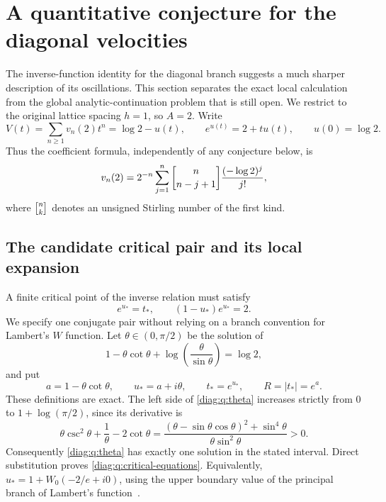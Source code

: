 \section{A quantitative conjecture for the diagonal velocities}
\label{diag:q:sec}

The inverse-function identity for the diagonal branch suggests a much
sharper description of its oscillations.  This section separates the exact
local calculation from the global analytic-continuation problem that is
still open.  We restrict to the original lattice spacing $h=1$, so $A=2$.
Write
\begin{equation}\label{diag:q:inverse}
 V(t)=\sum_{n\geq1}v_n(2)t^n=\log2-u(t),\qquad
 e^{u(t)}=2+tu(t),\qquad u(0)=\log2.
\end{equation}
Thus the coefficient formula, independently of any conjecture below, is
\begin{equation}\label{diag:q:exact-coefficients}
 v_n(2)=2^{-n}\sum_{j=1}^{n}
    \stirling{n}{n-j+1}\frac{(-\log2)^j}{j!},
\end{equation}
where $\stirling{n}{k}$ denotes an unsigned Stirling number of the first kind.

\subsection{The candidate critical pair and its local expansion}
\label{diag:q:critical-subsection}

A finite critical point of the inverse relation must satisfy
\begin{equation}\label{diag:q:critical-equations}
 e^{u_*}=t_*,\qquad (1-u_*)e^{u_*}=2.
\end{equation}
We specify one conjugate pair without relying on a branch convention for
Lambert's $W$ function.  Let $\theta\in(0,\pi/2)$ be the solution of
\begin{equation}\label{diag:q:theta}
 1-\theta\cot\theta+
       \log\!\left(\frac{\theta}{\sin\theta}\right)=\log2,
\end{equation}
and put
\begin{equation}\label{diag:q:parameters}
 a=1-\theta\cot\theta,\qquad u_*=a+i\theta,\qquad
 t_*=e^{u_*},\qquad R=|t_*|=e^a.
\end{equation}
These definitions are exact.  The left side of \eqref{diag:q:theta}
increases strictly from $0$ to $1+\log(\pi/2)$, since its derivative is
\[
 \theta\csc^2\theta+\frac1\theta-2\cot\theta
 =\frac{(\theta-\sin\theta\cos\theta)^2+\sin^4\theta}
         {\theta\sin^2\theta}>0.
\]
Consequently \eqref{diag:q:theta} has exactly one solution in the stated
interval.  Direct substitution proves \eqref{diag:q:critical-equations}.
Equivalently, $u_*=1+W_0(-2/e+i0)$, using the upper boundary value of the
principal branch of Lambert's function~\cite[\S4.13]{DLMF}.

